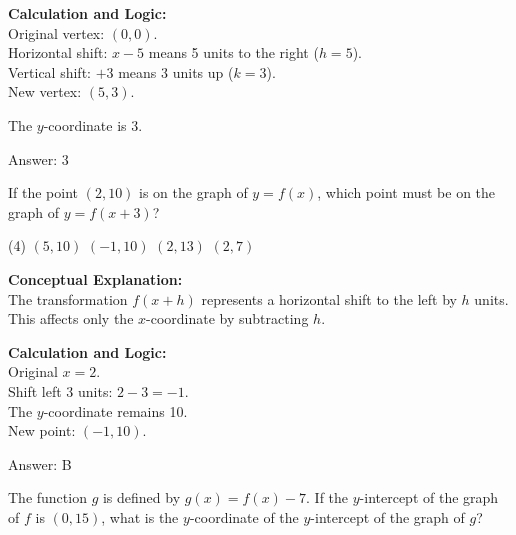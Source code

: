 \documentclass[11pt,paper=a4,answers]{exam}
\begin{document}
\begin{questions}
\begin{solution}
\vspace{20pt}

\textbf{Calculation and Logic:} \\
Original vertex: $(0, 0)$. \\
Horizontal shift: $x-5$ means 5 units to the right ($h=5$). \\
Vertical shift: $+3$ means 3 units up ($k=3$). \\
New vertex: $(5, 3)$.

\vspace{10pt}

The $y$-coordinate is 3.

\vspace{25pt}

Answer: \colorbox{yellow!100}{3}
\end{solution}

\vspace{40pt}

\question
If the point $(2, 10)$ is on the graph of $y = f(x)$, which point must be on the graph of $y = f(x + 3)$?
\begin{tasks}(4)
    \task $(5, 10)$
    \task $(-1, 10)$
    \task $(2, 13)$
    \task $(2, 7)$
\end{tasks}

\begin{solution}
\textbf{Conceptual Explanation:} \\
The transformation $f(x + h)$ represents a horizontal shift to the left by $h$ units. This affects only the $x$-coordinate by subtracting $h$.

\vspace{20pt}

\textbf{Calculation and Logic:} \\
Original $x = 2$. \\
Shift left 3 units: $2 - 3 = -1$. \\
The $y$-coordinate remains 10. \\
New point: $(-1, 10)$.

\vspace{25pt}

Answer: \colorbox{yellow!100}{B}
\end{solution}

\vspace{40pt}

\question
The function $g$ is defined by $g(x) = f(x) - 7$. If the $y$-intercept of the graph of $f$ is $(0, 15)$, what is the $y$-coordinate of the $y$-intercept of the graph of $g$?


\end{questions}
\end{document}
